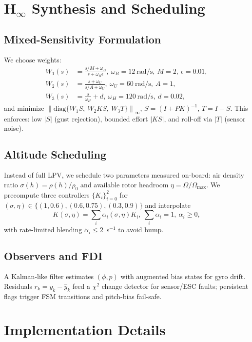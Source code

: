 \documentclass[conference]{IEEEtran}
\begin{document}
\section{H$_\infty$ Synthesis and Scheduling}
\subsection{Mixed-Sensitivity Formulation}
We choose weights:
\begin{align}
W_1(s)&=\frac{s/M+\omega_B}{s+\omega_B\epsilon},\ \omega_B=12~\mathrm{rad/s},\ M=2,\ \epsilon=0.01,\\
W_2(s)&=\frac{s+\omega_U}{s/A+\omega_U},\ \omega_U=60~\mathrm{rad/s},\ A=1,\\
W_3(s)&=\frac{s}{\omega_H}+d,\ \omega_H=120~\mathrm{rad/s},\ d=0.02,
\end{align}
and minimize $\left\| \mathrm{diag}\{W_1S,\ W_2KS,\ W_3T\}\right\|_\infty$, $S=(I+PK)^{-1}$, $T=I-S$.
This enforces: low $|S|$ (gust rejection), bounded effort $|KS|$, and roll-off via $|T|$ (sensor noise).

\subsection{Altitude Scheduling}
Instead of full LPV, we schedule two parameters measured on-board:
air density ratio $\sigma(h)=\rho(h)/\rho_0$ and available rotor headroom $\eta=\Omega/\Omega_{\max}$.
We precompute three controllers $\{K_i\}_{i=0}^2$ for $(\sigma,\eta)\in\{(1,0.6),(0.6,0.75),(0.3,0.9)\}$ and interpolate
\begin{equation}
K(\sigma,\eta)=\sum_i \alpha_i(\sigma,\eta) K_i,\ \sum_i \alpha_i=1,\ \alpha_i\ge0,
\end{equation}
with rate-limited blending $\dot{\alpha}_i\le 2$~s$^{-1}$ to avoid bump.

\subsection{Observers and FDI}
A Kalman-like filter estimates $(\phi,p)$ with augmented bias states for gyro drift. Residuals $r_k=y_k-\hat{y}_k$ feed a $\chi^2$ change detector for sensor/ESC faults; persistent flags trigger FSM transitions and pitch-bias fail-safe.

\section{Implementation Details}
\end{document}
